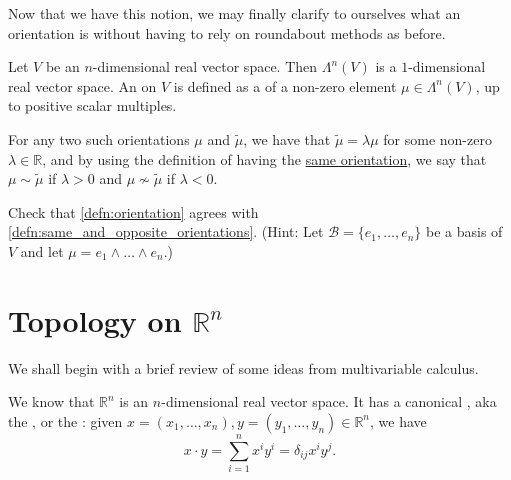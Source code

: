 \documentclass[notoc,notitlepage]{tufte-book}
\begin{document}
Now that we have this notion, we may finally clarify to ourselves what an orientation
is without having to rely on roundabout methods as before.

\begin{defn}[Orientation]\label{defn:orientation}
  Let $V$ be an $n$-dimensional real vector space. Then $\Lambda^n(V)$ is a
  $1$-dimensional real vector space. An  on $V$ is defined as a
   of a non-zero element $\mu \in \Lambda^n(V)$, up to positive scalar
  multiples.
\end{defn}

\begin{note}
  For any two such orientations $\mu$ and $\tilde{\mu}$, we have that 
  $\tilde{\mu} = \lambda \mu$ for some non-zero $\lambda \in \mathbb{R}$, and by using
  the definition of having the \hyperref[defn:same_and_opposite_orientations]{same orientation},
  we say that $\mu \sim \tilde{\mu}$ if $\lambda > 0$ and $\mu \not\sim \tilde{\mu}$ if
  $\lambda < 0$.
\end{note}

\begin{ex}
  Check that \cref{defn:orientation} agrees with \cref{defn:same_and_opposite_orientations}.
  (Hint: Let $\mathcal{B} = \{ e_1, \ldots, e_n \}$ be a basis of $V$ and let
  $\mu = e_1 \land \hdots \land e_n$.)
\end{ex}


\section{Topology on \texorpdfstring{$\mathbb{R}^n$}{Rn}}%
\label{sec:topology_on_r_n_}

We shall begin with a brief review of some ideas from multivariable calculus.

We know that $\mathbb{R}^n$ is an $n$-dimensional real vector space. It has a canonical
 , aka the ,
or the : given 
$x = (x_1, \ldots, x_n), y = (y_1, \ldots, y_n) \in \mathbb{R}^n$, we have
\begin{equation*}
  x \cdot y = \sum_{i=1}^{n} x^i y^i = \delta_{ij} x^i y^j.
\end{equation*}
\end{document}
